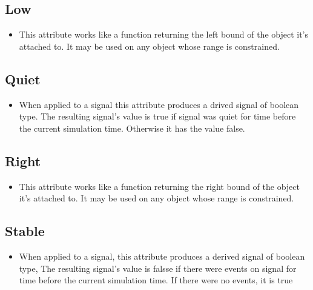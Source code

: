 \documentclass[a4paper,12pt]{article}
\begin{document}
	\subsection*{Low}
	\begin{itemize}
		\item This attribute works like a function returning the left bound of the object it's attached to. It may be used on any object whose range is constrained.
	\end{itemize}
	
	\subsection*{Quiet}
	\begin{itemize}
		\item When applied to a signal this attribute produces a drived signal of boolean type. The resulting signal's value is true if signal was quiet for time before the current simulation time. Otherwise it has the value false.
	\end{itemize}
	
	\subsection*{Right}
	\begin{itemize}
		\item This attribute works like a function returning the right bound of the object it’s attached to. It may be used on any object whose range is constrained.
	\end{itemize}
	
	\subsection*{Stable}
	\begin{itemize}
		\item When applied to a signal, this attribute produces a derived signal of boolean type, The resulting signal's value is falsse if there were events on signal for time before the current simulation time. If there were no events, it is true
	\end{itemize}
	
	
	
	
\end{document}
